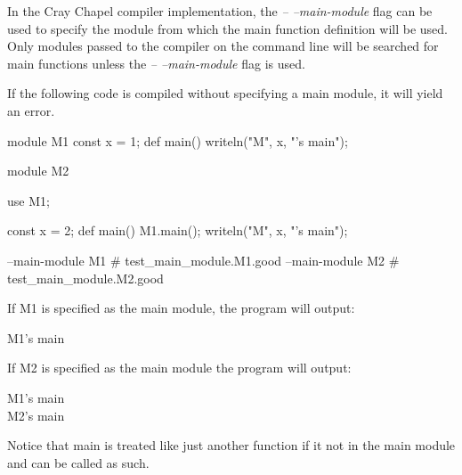 \begin{craychapel}
In the Cray Chapel compiler implementation, the \emph{--
--main-module} flag can be used to specify the module from which the
main function definition will be used.  Only modules passed to the
compiler on the command line will be searched for main functions
unless the \emph{-- --main-module} flag is used.
\end{craychapel}

\begin{example}
If the following code is compiled without specifying a main module, it
will yield an error.
\begin{chapelpre}
\end{chapelpre}
\begin{chapel}
module M1 {
  const x = 1;
  def main() {
    writeln("M", x, "'s main");
  }
}
 
module M2 {
  use M1;

  const x = 2;
  def main() {
    M1.main();
    writeln("M", x, "'s main");
  }
}
\end{chapel}
\begin{chapelcompopts}
--main-module M1 \# test\_main\_module.M1.good
--main-module M2 \# test\_main\_module.M2.good
\end{chapelcompopts}
If M1 is specified as the main module, the program will output:
\begin{chapelprintoutput}
M1's main
\end{chapelprintoutput}
If M2 is specified as the main module the program will output:
\begin{chapelprintoutput}
M1's main\\
M2's main
\end{chapelprintoutput}
Notice that main is treated like just another function if it not in
the main module and can be called as such.
\end{example}



